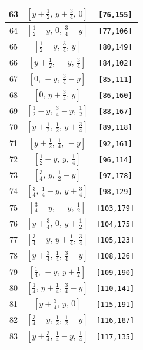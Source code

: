\documentclass[fleqn,8pt]{jsarticle}
\begin{document}
\begin{longtable}{ccc}
63 & $\left[ y + \frac{1}{2},\, y + \frac{3}{4},\, 0 \right]$ & {\tt [76,155]} \\ \hline
64 & $\left[ \frac{1}{2} - y,\, 0,\, \frac{3}{4} - y \right]$ & {\tt [77,106]} \\ \hline
65 & $\left[ \frac{1}{2} - y,\, \frac{3}{4},\, y \right]$ & {\tt [80,149]} \\ \hline
66 & $\left[ y + \frac{1}{2},\, - y,\, \frac{3}{4} \right]$ & {\tt [84,102]} \\ \hline
67 & $\left[ 0,\, - y,\, \frac{3}{4} - y \right]$ & {\tt [85,111]} \\ \hline
68 & $\left[ 0,\, y + \frac{3}{4},\, y \right]$ & {\tt [86,160]} \\ \hline
69 & $\left[ \frac{1}{2} - y,\, \frac{3}{4} - y,\, \frac{1}{2} \right]$ & {\tt [88,167]} \\ \hline
70 & $\left[ y + \frac{1}{2},\, \frac{1}{2},\, y + \frac{3}{4} \right]$ & {\tt [89,118]} \\ \hline
71 & $\left[ y + \frac{1}{2},\, \frac{1}{4},\, - y \right]$ & {\tt [92,161]} \\ \hline
72 & $\left[ \frac{1}{2} - y,\, y,\, \frac{1}{4} \right]$ & {\tt [96,114]} \\ \hline
73 & $\left[ \frac{3}{4},\, y,\, \frac{1}{2} - y \right]$ & {\tt [97,178]} \\ \hline
74 & $\left[ \frac{3}{4},\, \frac{1}{4} - y,\, y + \frac{3}{4} \right]$ & {\tt [98,129]} \\ \hline
75 & $\left[ \frac{3}{4} - y,\, - y,\, \frac{1}{2} \right]$ & {\tt [103,179]} \\ \hline
76 & $\left[ y + \frac{3}{4},\, 0,\, y + \frac{1}{2} \right]$ & {\tt [104,175]} \\ \hline
77 & $\left[ \frac{3}{4} - y,\, y + \frac{1}{4},\, \frac{3}{4} \right]$ & {\tt [105,123]} \\ \hline
78 & $\left[ y + \frac{3}{4},\, \frac{1}{4},\, \frac{3}{4} - y \right]$ & {\tt [108,126]} \\ \hline
79 & $\left[ \frac{1}{4},\, - y,\, y + \frac{1}{2} \right]$ & {\tt [109,190]} \\ \hline
80 & $\left[ \frac{1}{4},\, y + \frac{1}{4},\, \frac{3}{4} - y \right]$ & {\tt [110,141]} \\ \hline
81 & $\left[ y + \frac{3}{4},\, y,\, 0 \right]$ & {\tt [115,191]} \\ \hline
82 & $\left[ \frac{3}{4} - y,\, \frac{1}{2},\, \frac{1}{2} - y \right]$ & {\tt [116,187]} \\ \hline
83 & $\left[ y + \frac{3}{4},\, \frac{1}{4} - y,\, \frac{1}{4} \right]$ & {\tt [117,135]} \\ \hline

\end{longtable}
\end{document}
